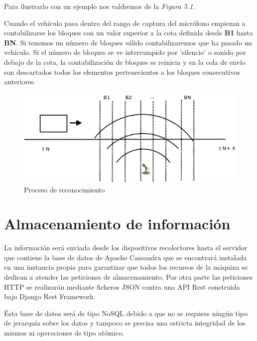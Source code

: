\begin{itemize}
  Para ilustrarlo con un ejemplo nos valdremos de la \textit{Figura 5.1}.

  Cuando el vehículo pasa dentro del rango de captura del micrófono empiezan a contabilizarse los bloques con un valor superior a la cota definida desde \textbf{B1} hasta \textbf{BN}. Si tenemos un número de bloques válido contabilizaremos que ha pasado un vehículo. Si el número de bloques se ve interrumpido por 'silencio' o sonido por debajo de la cota, la contabilización de bloques se reinicia y en la cola de envío son descartados todos los elementos pertenecientes a los bloques consecutivos anteriores.
\end{itemize}
\begin{figure}[!ht]
  \begin{center}
    \includegraphics[scale=0.50]{../images/sound/soun_detect.png}
    \caption{Proceso de reconocimiento}
    \label{fig:recogn}
  \end{center}
\end{figure}

\newpage

\section{Almacenamiento de información}

La información será enviada desde los dispositivos recolectores hasta el servidor que contiene la base de datos de Apache Cassandra que se encontrará instalada en una instancia propia para garantizar que todos los recursos de la máquina se dedican a atender las peticiones de almacenamiento. Por otra parte las peticiones HTTP se realizarán mediante ficheros JSON contra una API Rest construida bajo Django Rest Framework.

Ésta base de datos será de tipo NoSQL debido a que no se requiere ningún tipo de jerarquía sobre los datos y tampoco se precisa una estricta integridad de los mismos ni operaciones de tipo atómico.

